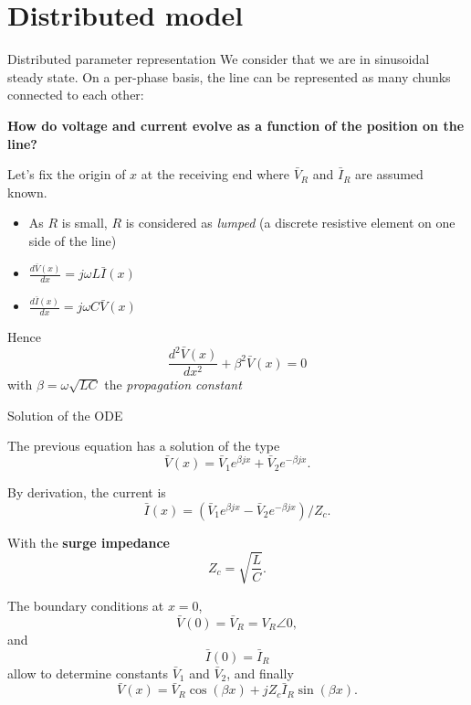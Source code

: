 \section{Distributed model}
\begin{frame}[allowframebreaks]{Distributed parameter representation}
    We consider that we are in sinusoidal steady state. 
    On a per-phase basis, the line can be represented as many chunks connected to each other:  
    \begin{center}
        
    \end{center}
    \textbf{How do voltage and current evolve as a function of the position on the line?}

    \alert{Let's fix the origin of $x$ at the receiving end where $\bar{V}_R$ and $\bar{I}_R$ are assumed known.}

    \begin{itemize}
        \item As $R$ is small, $R$ is considered as \textit{lumped} (a discrete resistive element on one side of the line)
        \item $\frac{d\bar{V}(x)}{dx} = j\omega L \bar{I}(x)$
        \item $\frac{d\bar{I}(x)}{dx} = j\omega C \bar{V}(x)$
    \end{itemize}

    Hence $$\frac{d^2\bar{V}(x)}{dx^2} + \beta^2 \bar{V}(x) = 0$$
    with $\beta = \omega \sqrt{LC}$ the \textit{propagation constant}
\end{frame}
\begin{frame}[allowframebreaks]{Solution of the ODE}

    The previous equation has a solution of the type 
    $$\bar{V}(x) = \bar{V}_1 e^{\beta j x} + \bar{V}_2 e^{-\beta j x}.$$
    
        
    By derivation, the current is  $$\bar{I}(x) = (\bar{V}_1 e^{\beta j x} - \bar{V}_2 e^{-\beta j x}) / Z_c.$$
    
    With the \textbf{surge impedance} $$Z_c = \sqrt{\frac{L}{C}}.$$
    
    The boundary conditions at $x=0$, $$\bar{V}(0) = \bar{V}_R = V_R \angle 0,$$  and $$\bar{I}(0) = \bar{I}_R$$
    allow to determine constants $\bar{V}_1$ and $\bar{V}_2$, and finally
    $$
    \bar{V}(x) = \bar{V}_R \cos(\beta x) + j Z_c \bar{I}_R \sin(\beta x).
    $$
\end{frame}

